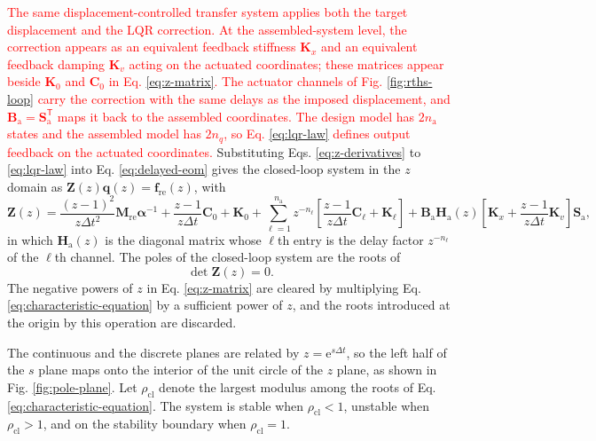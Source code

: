 \documentclass[11pt,a4paper]{article}
\numberwithin{equation}{section}
\newcommand{\rev}[1]{\textcolor{red}{#1}}
\begin{document}
\rev{The same displacement-controlled transfer system applies both the target displacement and the LQR correction. At the assembled-system level, the correction appears as an equivalent feedback stiffness \(\mathbf{K}_{x}\) and an equivalent feedback damping \(\mathbf{K}_{v}\) acting on the actuated coordinates; these matrices appear beside \(\mathbf{K}_{0}\) and \(\mathbf{C}_{0}\) in Eq. \eqref{eq:z-matrix}. The actuator channels of Fig. \ref{fig:rths-loop} carry the correction with the same delays as the imposed displacement, and \(\mathbf{B}_{\mathrm{a}}=\mathbf{S}_{\mathrm{a}}^{\mathsf{T}}\) maps it back to the assembled coordinates. The design model has \(2n_{\mathrm{a}}\) states and the assembled model has \(2n_{q}\), so Eq. \eqref{eq:lqr-law} defines output feedback on the actuated coordinates.}
Substituting Eqs. \eqref{eq:z-derivatives} to \eqref{eq:lqr-law} into Eq. \eqref{eq:delayed-eom} gives the closed-loop system in the \(z\) domain as \(\mathbf{Z}(z)\bm{q}(z)=\bm{f}_{\mathrm{re}}(z)\), with
\begin{equation}
	\mathbf{Z}(z)=
	\frac{(z-1)^{2}}{z\Delta t^{2}}\mathbf{M}_{\mathrm{re}}\bm{\alpha}^{-1}
	+\frac{z-1}{z\Delta t}\mathbf{C}_{0}+\mathbf{K}_{0}
	+\sum_{\ell=1}^{n_{\mathrm{a}}}z^{-n_{\ell}}
	\left[
	\frac{z-1}{z\Delta t}\mathbf{C}_{\ell}+\mathbf{K}_{\ell}
	\right]
	+\mathbf{B}_{\mathrm{a}}\mathbf{H}_{\mathrm{a}}(z)
	\left[
	\mathbf{K}_{x}+\frac{z-1}{z\Delta t}\mathbf{K}_{v}
	\right]\mathbf{S}_{\mathrm{a}},
	\label{eq:z-matrix}
\end{equation}
in which \(\mathbf{H}_{\mathrm{a}}(z)\) is the diagonal matrix whose \(\ell\)th entry is the delay factor \(z^{-n_{\ell}}\) of the \(\ell\)th channel. The poles of the closed-loop system are the roots of
\begin{equation}
	\det\mathbf{Z}(z)=0.
	\label{eq:characteristic-equation}
\end{equation}
The negative powers of \(z\) in Eq. \eqref{eq:z-matrix} are cleared by multiplying Eq. \eqref{eq:characteristic-equation} by a sufficient power of \(z\), and the roots introduced at the origin by this operation are discarded.

The continuous and the discrete planes are related by \(z=\mathrm{e}^{s\Delta t}\), so the left half of the \(s\) plane maps onto the interior of the unit circle of the \(z\) plane, as shown in Fig. \ref{fig:pole-plane}. Let \(\rho_{\mathrm{cl}}\) denote the largest modulus among the roots of Eq. \eqref{eq:characteristic-equation}. The system is stable when \(\rho_{\mathrm{cl}}<1\), unstable when \(\rho_{\mathrm{cl}}>1\), and on the stability boundary when \(\rho_{\mathrm{cl}}=1\).
\end{document}
